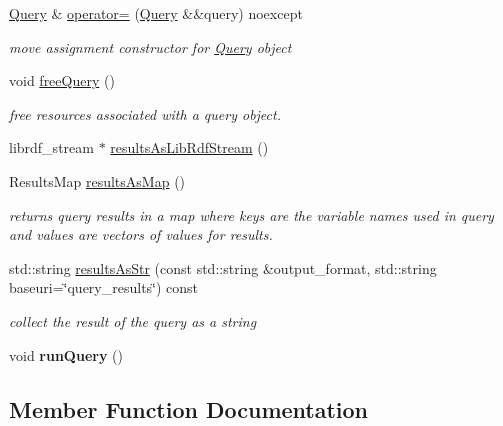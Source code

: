 \begin{DoxyCompactItemize}
\item 
\mbox{\label{classomexmeta_1_1Query_a818772558b490e25b2ee1bc2417e1282}} 
\hyperlink{classomexmeta_1_1Query}{Query} \& \hyperlink{classomexmeta_1_1Query_a818772558b490e25b2ee1bc2417e1282}{operator=} (\hyperlink{classomexmeta_1_1Query}{Query} \&\&query) noexcept
\begin{DoxyCompactList}\small\item\em move assignment constructor for \hyperlink{classomexmeta_1_1Query}{Query} object \end{DoxyCompactList}\item 
void \hyperlink{classomexmeta_1_1Query_a0b9e4ef7fb6c3d0e79a51ed327639ac0}{free\+Query} ()
\begin{DoxyCompactList}\small\item\em free resources associated with a query object. \end{DoxyCompactList}\item 
librdf\+\_\+stream $\ast$ \hyperlink{classomexmeta_1_1Query_a0dda4502056d712d351f7057329c7688}{results\+As\+Lib\+Rdf\+Stream} ()
\item 
Results\+Map \hyperlink{classomexmeta_1_1Query_ab50cc5f76dcf7f863f9fa9d0bf755071}{results\+As\+Map} ()
\begin{DoxyCompactList}\small\item\em returns query results in a map where keys are the variable names used in query and values are vectors of values for results. \end{DoxyCompactList}\item 
std\+::string \hyperlink{classomexmeta_1_1Query_a7109dd08bd808bf5a20becb164622ed6}{results\+As\+Str} (const std\+::string \&output\+\_\+format, std\+::string baseuri=\char`\"{}query\+\_\+results\char`\"{}) const
\begin{DoxyCompactList}\small\item\em collect the result of the query as a string \end{DoxyCompactList}\item 
\mbox{\label{classomexmeta_1_1Query_a879a4db0413abc8f4a3470877ebf5193}} 
void {\bfseries run\+Query} ()
\end{DoxyCompactItemize}


\subsection{Member Function Documentation}
\mbox{\label{classomexmeta_1_1Query_a0b9e4ef7fb6c3d0e79a51ed327639ac0}} 
